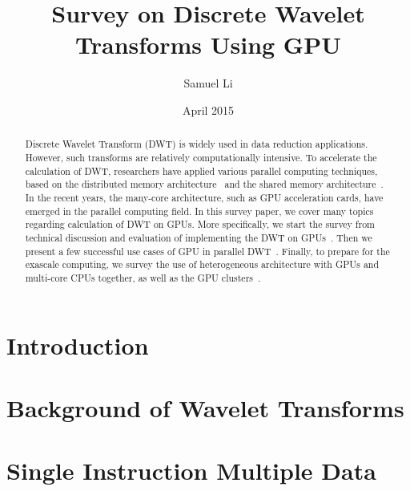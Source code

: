 \documentclass{article}
\title{Survey on Discrete Wavelet Transforms Using GPU}
\author{Samuel Li}
\date{April 2015}
\begin{document}
\maketitle

\begin{abstract}
Discrete Wavelet Transform (DWT) is widely used in data reduction applications.
%
However, such transforms are relatively computationally intensive.
%
To accelerate the calculation of DWT, researchers have applied various parallel
computing techniques, based on the distributed memory architecture~\cite{
chadha2002scalable, woo1995parallel, uhl1996wavelet, nielsen1997scalable}
and the shared memory architecture~\cite{
lucka2000parallel, uhl2000optimization,kutil1999hardware}.
%
In the recent years, the many-core architecture, such as GPU acceleration 
cards, have emerged in the parallel computing field.
%
In this survey paper, we cover many topics regarding calculation of DWT on GPUs.
%
More specifically, we start the survey from technical discussion and evaluation
of implementing the DWT on GPUs~\cite{tenllado2008parallel, van2011accelerating,
garcia2005gpu}.
%
Then we present a few successful use cases of GPU in parallel DWT~\cite{
strengert2004hierarchical, strengert2006pyramid, wong2007discrete,
treib2012turbulence}.
%
Finally, to prepare for the exascale computing, we survey the use of 
heterogeneous architecture with GPUs and multi-core CPUs together,
as well as the GPU clusters~\cite{franco2009parallel, franco2010parallel,
strengert2005large, franco20122d, rossinelli2011multicore}.
%
\end{abstract}

\section{Introduction}

\section{Background of Wavelet Transforms}


\section{Single Instruction Multiple Data}


 
%

\end{document}
